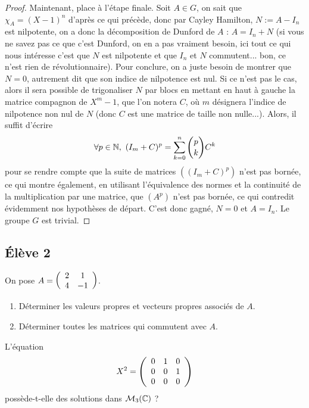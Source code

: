 \documentclass[10pt]{scrartcl}
\begin{document}
\begin{proof}
        Maintenant, place à l'étape finale.
        Soit $A\in G$, on sait que $\chi_A=(X-1)^n$ d'après ce qui précède, donc par 
        Cayley Hamilton, $N:=A-I_n$ est nilpotente, on a donc la décomposition de Dunford 
        de $A$ : $A=I_n+N$ (si vous ne savez pas ce que c'est Dunford, on en a pas vraiment 
        besoin, ici tout ce qui nous intéresse c'est que $N$ est nilpotente et que $I_n$ et 
        $N$ commutent... bon, ce n'est rien de révolutionnaire).
        Pour conclure, on a juste besoin de montrer que $N=0$, autrement dit que son indice
        de nilpotence est nul. 
        Si ce n'est pas le cas, alors il sera possible de trigonaliser $N$ par blocs en 
        mettant en haut à gauche la matrice compagnon de $X^m-1$, que l'on notera $C$, où
        $m$ désignera l'indice de nilpotence non nul de $N$ (donc $C$ est une
        matrice de taille non nulle...). 
        Alors, il suffit d'écrire
        \[
            \forall p\in\operatorname{\mathbb N},\ (I_m+C)^p=\sum_{k=0}^n\binom pk C^k
        \]
        pour se rendre compte que la suite de matrices $((I_m+C)^p)$ n'est pas bornée, ce
        qui montre également, en utilisant l'équivalence des normes et la continuité de 
        la multiplication par une matrice, que $(A^p)$ n'est pas bornée, ce qui contredit 
        évidemment nos hypothèses de départ. 
        C'est donc gagné, $N=0$ et $A=I_n$. 
        Le groupe $G$ est trivial.
    \end{proof}

    \subsection*{Élève 2}
    \begin{ccp}
        On pose $A=\left(\begin{array}{c c} 2 & 1\\ 4 & -1\end{array}\right)$.
        \begin{enumerate}
            \item Déterminer les valeurs propres et vecteurs propres associés de $A$.
            \item Déterminer toutes les matrices qui commutent avec $A$.
        \end{enumerate}
    \end{ccp}

    \begin{exo}
        L'équation 
        \[
            X^2=\left(\begin{array}{c c c} 0 & 1 & 0\\ 0 & 0 & 1\\ 0 & 0 & 0\end{array}\right)
        \]
        possède-t-elle des solutions dans $\mathcal M_3(\operatorname{\mathbb C})$ ? 
    \end{exo}
\end{document}
